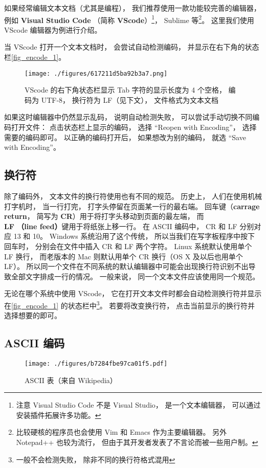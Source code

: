 如果经常编辑文本文档（尤其是编程）， 我们推荐使用一款功能较完善的编辑器， 例如 \textbf{Visual Studio Code} （简称 \textbf{VScode}）\footnote{注意 Visual Studio Code 不是 Visual Studio， 是一个文本编辑器， 可以通过安装插件拓展许多功能。}， Sublime 等\footnote{比较硬核的程序员也会使用 Vim 和 Emacs 作为主要编辑器。 另外 Notepad++ 也较为流行， 但由于其开发者发表了不言论而被一些用户制。}。 这里我们使用 VScode 编辑器为例进行介绍。

当 VScode 打开一个文本文档时， 会尝试自动检测编码， 并显示在右下角的状态栏\autoref{fig_encode_1}。
\begin{figure}[ht]
\centering
\texttt{[image: ./figures/617211d5ba92b3a7.png]}
\caption{VScode 的右下角状态栏显示 Tab 字符的显示长度为 4 个空格， 编码为 UTF-8， 换行符为 LF（见下文）， 文件格式为文本文档} \label{fig_encode_1}
\end{figure}
如果这时编辑器中仍然显示乱码， 说明自动检测失败， 可以尝试手动切换不同编码打开文件： 点击状态栏上显示的编码， 选择 “Reopen with Encoding”， 选择需要的编码即可。 以正确的编码打开后， 如果想改为别的编码， 就选 “Save with Encoding”。

\subsection{换行符}\label{sub_encode_1}
除了编码外， 文本文件的换行符使用也有不同的规范。 历史上， 人们在使用机械打字机时， 当一行打完， 打字头停留在页面某一行的最右端。 回车键（\textbf{carrage return}， 简写为 \textbf{CR}）用于将打字头移动到页面的最左端， 而 \textbf{LF （line feed）}键用于将纸张上移一行。 在 ASCII 编码中， CR 和 LF 分别对应 13 和 10。 Windows 系统沿用了这个传统， 所以当我们在写字板程序中按下回车时， 分别会在文件中插入 CR 和 LF 两个字符。 Linux 系统默认使用单个 LF 换行， 而老版本的 Mac 则默认用单个 CR 换行（OS X 及以后也用单个 LF）。 所以同一个文件在不同系统的默认编辑器中可能会出现换行符识别不出导致全部文字排成一行的情况。 一般来说， 同一个文本文件应该使用同一个规范。

无论在哪个系统中使用 VScode， 它在打开文本文件时都会自动检测换行符并显示在\autoref{fig_encode_1} 的状态栏中\footnote{一般不会检测失败， 除非不同的换行符格式混用}。 若要将改变换行符， 点击当前显示的换行符并选择想要的即可。

\subsection{ASCII 编码}
\begin{figure}[ht]
\centering
\texttt{[image: ./figures/b7284fbe97ca01f5.pdf]}
\caption{ASCII 表（来自 Wikipedia）} \label{fig_encode_2}
\end{figure}


